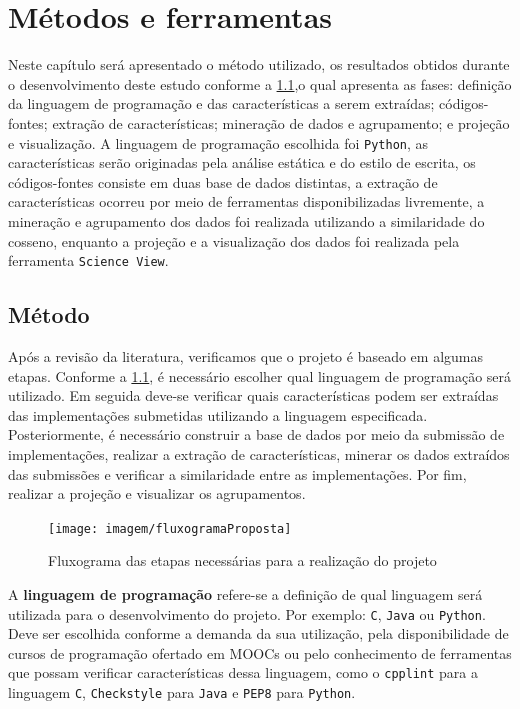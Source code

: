 \chapter{Métodos e ferramentas}
\label{chap:metodos-ferramentas}

	Neste capítulo será apresentado o método utilizado, os resultados obtidos durante
	o desenvolvimento deste estudo conforme a \cref{fig:fluxogramaProposta},o qual
	apresenta as fases: definição da linguagem de programação e das características
	a serem extraídas; códigos-fontes; extração de características; mineração de dados e
	agrupamento; e projeção e visualização. A linguagem de programação escolhida foi \texttt{Python},
	as características serão originadas pela análise estática e do estilo de escrita,
	os códigos-fontes consiste em duas base de dados distintas, a extração
	de características ocorreu por meio de ferramentas disponibilizadas livremente, a
	mineração e agrupamento dos dados foi realizada utilizando a similaridade do
	cosseno, enquanto a projeção e a visualização dos dados foi realizada pela ferramenta
	\texttt{Science View}.
	 


 	\section{Método}
	 	Após a revisão da literatura, verificamos que o projeto é baseado em algumas etapas.
	 	Conforme a \cref{fig:fluxogramaProposta}, é necessário escolher qual linguagem de programação
	 	será utilizado. Em seguida deve-se verificar quais características podem ser extraídas
	 	das implementações submetidas utilizando a linguagem especificada. Posteriormente, é
	 	necessário construir a base de dados por meio da submissão de implementações, realizar
	 	a extração de características, minerar os dados extraídos das submissões e verificar a
	 	similaridade entre as implementações. Por fim, realizar a projeção e visualizar os
	 	agrupamentos.
	 	
	 	\begin{figure}[h]
	 		\centering
	 		\texttt{[image: imagem/fluxogramaProposta]}
	 		\caption{Fluxograma das etapas necessárias para a realização do projeto}
	 		\label{fig:fluxogramaProposta}
	 	\end{figure}
	 	
	 	A \textbf{linguagem de programação} refere-se a definição de qual linguagem será
	 	utilizada para o desenvolvimento do projeto. Por exemplo: \texttt{C}, \texttt{Java}
	 	ou \texttt{Python}. Deve ser escolhida conforme a demanda da sua utilização, pela
	 	disponibilidade de cursos de programação ofertado em \acs{MOOC}s ou pelo conhecimento de
	 	ferramentas que possam verificar características dessa linguagem, como o
	 	\texttt{cpplint} para a linguagem \texttt{C}, \texttt{Checkstyle} para
	 	\texttt{Java} e \texttt{PEP8} para \texttt{Python}.
	 	
